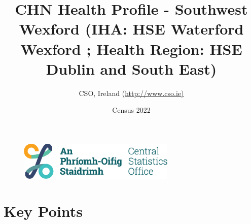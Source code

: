 \documentclass{article}
\title{CHN Health Profile - Southwest Wexford (IHA: HSE Waterford Wexford ;  Health Region: HSE Dublin and South East) }
\date{Census 2022}
\author{CSO, Ireland  (\url{http://www.cso.ie)}}
\begin{document}


\begin{figure}
	\centering
\includegraphics[width =75mm]{../figures/CSO_Logo.png}
\end{figure}

				 
		   
						  
														  
																																													
												 
			 
\maketitle
					
													   
				 
						 
																																																																											   
				 
				  
  \pagebreak
    	    \tableofcontents

\pagebreak


\section{Key Points}
\end{document}
